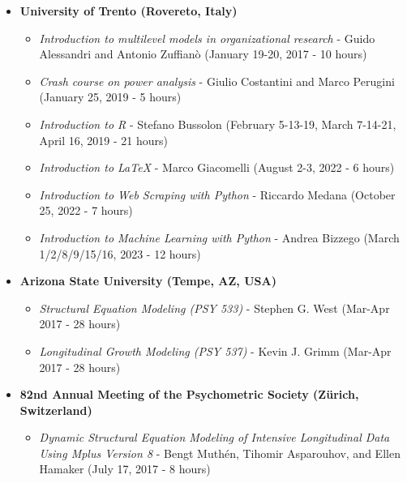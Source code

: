 \documentclass[hidelinks, letterpaper,10pt]{article} %
\begin{document}
\begin{itemize}
\item \textbf{University of Trento (Rovereto, Italy)} \\
    \begin{itemize}
    \item \textit{Introduction to multilevel models in organizational research} - Guido Alessandri and Antonio Zuffianò (January 19-20, 2017 - 10 hours) \\
    \item \textit{Crash course on power analysis} - Giulio Costantini and Marco Perugini (January 25, 2019 - 5 hours) \\
    \item \textit{Introduction to R} - Stefano Bussolon (February 5-13-19, March 7-14-21, April 16, 2019 - 21 hours) \\
    \item \textit{Introduction to \LaTeX} - Marco Giacomelli (August 2-3, 2022 - 6 hours) \\
    \item \textit{Introduction to Web Scraping with Python} - Riccardo Medana (October 25, 2022 - 7 hours)
    \item \textit{Introduction to Machine Learning with Python} - Andrea Bizzego (March 1/2/8/9/15/16, 2023 - 12 hours)
    \end{itemize}
    
\item \textbf{Arizona State University (Tempe, AZ, USA)} \\
    \begin{itemize}
    \item \textit{Structural Equation Modeling (PSY 533)} - Stephen G. West (Mar-Apr 2017 - 28 hours) \\
    \item \textit{Longitudinal Growth Modeling (PSY 537)} - Kevin J. Grimm (Mar-Apr 2017 - 28 hours) \\
    \end{itemize}

\item \textbf{82nd Annual Meeting of the Psychometric Society (Zürich, Switzerland)} \\
   \begin{itemize}
    \item \textit{Dynamic Structural Equation Modeling of Intensive Longitudinal Data Using Mplus Version 8} - Bengt Muthén, Tihomir Asparouhov, and Ellen Hamaker (July 17, 2017 - 8 hours) \\
    \end{itemize}


\end{itemize}
\end{document}
